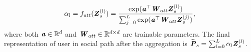 \documentclass[letterpaper]{article} %
\begin{document}
\begin{align}
    {\alpha}_l = f_{att}(\textbf{\textit{Z}}_{s}^{(l)}) = \frac{\exp(\textbf{\textit{a}}^{\top}\textbf{\textit{W}}_{att} \textbf{\textit{Z}}^{(l)}_{s})}{\sum_{j=0}^{L}\exp(\textbf{\textit{a}}^{\top}\textbf{\textit{W}}_{att}\textbf{\textit{Z}}^{(j)}_s)},
\end{align}
where both $\textbf{\textit{a}}\in \mathbb{R}^{d}$ and $\textbf{\textit{W}}_{att}\in \mathbb{R}^{d\times d}$ are trainable parameters. The final representation of user in social path after the aggregation is $\widetilde{\textbf{\textit{P}}}_s=\sum_{l=0}^{L}{{\alpha}_l\textbf{\textit{Z}}^{(l)}_s}$.
\end{document}
